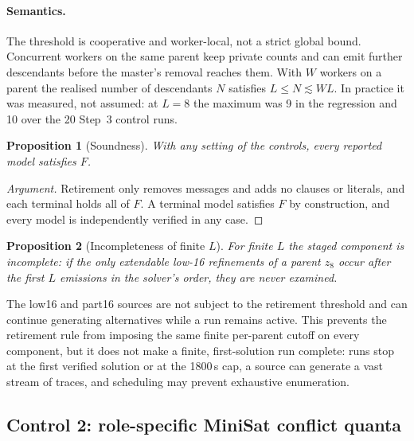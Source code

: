 \documentclass[11pt,a4paper]{article}
\newtheorem{proposition}{Proposition}
\begin{document}
\paragraph{Semantics.} The threshold is cooperative and worker-local, not a strict global bound.
Concurrent workers on the same parent keep private counts and can emit further descendants before
the master's removal reaches them. With $W$ workers on a parent the realised number of descendants
$N$ satisfies $L\le N\lesssim W L$. In practice it was measured, not assumed: at $L=8$ the maximum
was 9 in the regression and 10 over the 20 Step~3 control runs.

\begin{proposition}[Soundness]
With any setting of the controls, every reported model satisfies $F$.
\end{proposition}
\begin{proof}[Argument]
Retirement only removes messages and adds no clauses or literals, and each terminal holds all of $F$.
A terminal model satisfies $F$ by construction, and every model is independently verified in any case.
\end{proof}

\begin{proposition}[Incompleteness of finite \texorpdfstring{$L$}{L}]
For finite $L$ the staged component is incomplete: if the only extendable low-16 refinements of a
parent $z_8$ occur after the first $L$ emissions in the solver's order, they are never examined.
\end{proposition}
The low16 and part16 sources are not subject to the retirement threshold and can continue
generating alternatives while a run remains active. This prevents the retirement rule from imposing
the same finite per-parent cutoff on every component, but it does not make a finite, first-solution
run complete: runs stop at the first verified solution or at the 1800\,s cap, a source can generate
a vast stream of traces, and scheduling may prevent exhaustive enumeration.

\begin{center}\end{center}

\subsection{Control 2: role-specific MiniSat conflict quanta}
\end{document}
